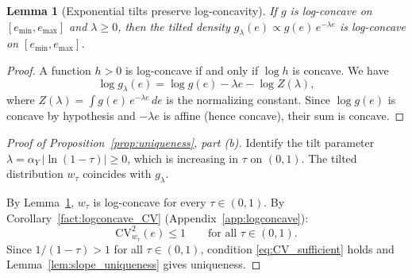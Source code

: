 \documentclass[12pt,a4paper]{article}
\theoremstyle{definition}
\theoremstyle{plain}
\newtheorem{lemma}{Lemma}[section]
\theoremstyle{remark}
\begin{document}
\begin{lemma}[Exponential tilts preserve log-concavity]
\label{lem:tilt_logconcave}
If $g$ is log-concave on $[e_{\min}, e_{\max}]$ and
$\lambda \geq 0$, then the tilted density
$g_\lambda(e) \propto g(e)\,e^{-\lambda e}$ is log-concave
on $[e_{\min}, e_{\max}]$.
\end{lemma}

\begin{proof}
A function $h > 0$ is log-concave if and only if $\log h$ is
concave.  We have
\[
  \log g_\lambda(e)
  = \log g(e) - \lambda e - \log Z(\lambda),
\]
where $Z(\lambda) = \int g(e)\,e^{-\lambda e}\,de$ is the
normalizing constant.  Since $\log g(e)$ is concave by
hypothesis and $-\lambda e$ is affine (hence concave), their
sum is concave.
\end{proof}


\begin{proof}[Proof of Proposition~\ref{prop:uniqueness}, part (b)]
Identify the tilt parameter
$\lambda = \alpha_Y\,|\!\ln(1-\tau)| \geq 0$, which is
increasing in $\tau$ on $(0,1)$.  The tilted distribution
$w_\tau$ coincides with $g_\lambda$.

By Lemma~\ref{lem:tilt_logconcave}, $w_\tau$ is log-concave
for every $\tau \in (0,1)$.  By
Corollary~\ref{fact:logconcave_CV} (Appendix~\ref{app:logconcave}):
\[
  \mathrm{CV}^2_{w_\tau}(e) \leq 1
  \qquad \text{for all } \tau \in (0,1).
\]
Since $1/(1-\tau) > 1$ for all $\tau \in (0,1)$, condition
\eqref{eq:CV_sufficient} holds and
Lemma~\ref{lem:slope_uniqueness} gives uniqueness.
\end{proof}

\end{document}
